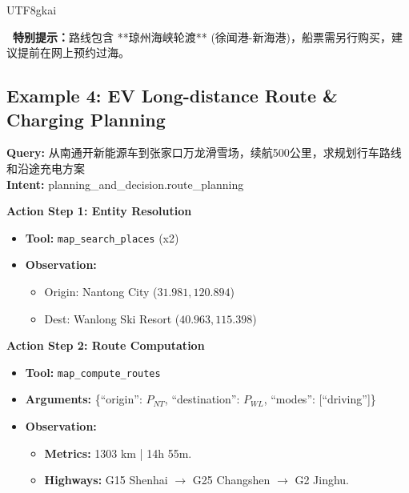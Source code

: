 \documentclass{article} %
\begin{document}
\begin{CJK*}{UTF8}{gkai}
\begin{tcolorbox}[
    breakable,
    enhanced,
    colframe=color_amapblue,
    colback=mycolor,
    coltitle=white,
    title = {\textbf{Case Study: Cross-province Self-driving Guide}},
    fonttitle=\bfseries
]
\begin{tcolorbox}[colback=white, colframe=color_amapblue!30!white, arc=4pt, boxrule=1pt, left=4pt, right=4pt, top=4pt, bottom=4pt]
    \colorbox{color_amapgrey}{\parbox{\dimexpr\linewidth-6pt}{
        \scriptsize 
        \textbf{\faShip\ 特别提示：}路线包含 **琼州海峡轮渡** (徐闻港-新海港)，船票需另行购买，建议提前在网上预约过海。
    }}
\end{tcolorbox}

\end{tcolorbox}



\subsection{Example 4: EV Long-distance Route \& Charging Planning}
\begin{tcolorbox}[
    breakable,
    enhanced,
    colframe=color_amapblue,
    colback=mycolor,
    coltitle=white,
    title = {\textbf{Case Study: EV Inter-provincial Travel Guide}},
    fonttitle=\bfseries
]

\textbf{Query:} 从南通开新能源车到张家口万龙滑雪场，续航500公里，求规划行车路线和沿途充电方案\\
\textbf{Intent:} planning\_and\_decision.route\_planning
\tcblower

\textbf{Action Step 1: Entity Resolution}
\begin{itemize}[leftmargin=12pt, itemsep=0pt]
  \item \textbf{Tool:} \texttt{map\_search\_places} (x2)
  \item \textbf{Observation:} 
    \begin{itemize}[leftmargin=10pt, itemsep=0pt]
        \item Origin: Nantong City ($31.981, 120.894$)
        \item Dest: Wanlong Ski Resort ($40.963, 115.398$)
    \end{itemize}
\end{itemize}

\textbf{Action Step 2: Route Computation}
\begin{itemize}[leftmargin=12pt, itemsep=0pt]
  \item \textbf{Tool:} \texttt{map\_compute\_routes}
  \item \textbf{Arguments:} \{``origin'': $P_{NT}$, ``destination'': $P_{WL}$, ``modes'': [``driving'']\}
  \item \textbf{Observation:} 
    \begin{itemize}[leftmargin=10pt]
        \item \textbf{Metrics:} 1303 km | 14h 55m.
        \item \textbf{Highways:} G15 Shenhai $\rightarrow$ G25 Changshen $\rightarrow$ G2 Jinghu.
    \end{itemize}
\end{itemize}


\end{tcolorbox}
\end{CJK*}
\end{document}
